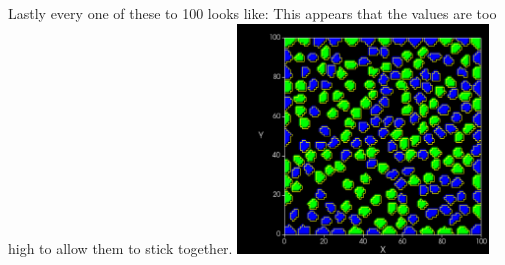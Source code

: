 \documentclass{article}
\begin{document}
Lastly every one of these to 100 looks like:
This appears that the values are too high to allow them to stick together.
    \includegraphics[width=0.5\textwidth]{changing_condensing_100s}
\end{document}

